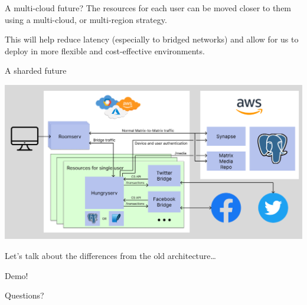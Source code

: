 \documentclass{beeper}
\begin{document}
\begin{frame}{A multi-cloud future?}
    The resources for each user can be moved closer to them using a multi-cloud,
    or multi-region strategy.

    This will help reduce latency (especially to bridged networks) and allow for
    us to deploy in more flexible and cost-effective environments.
\end{frame}

\begin{frame}{A sharded future}
    \centerline{\includegraphics[width=1.15\textwidth]{images/new-architecture}}

    Let's talk about the differences from the old architecture\ldots
\end{frame}

\begingroup
\def\insertframenumber{\relax}
\begin{frame}[standout]
    \Large
    Demo!
\end{frame}

\begin{frame}[standout]
    \Large
    Questions?
\end{frame}
\endgroup
\end{document}
